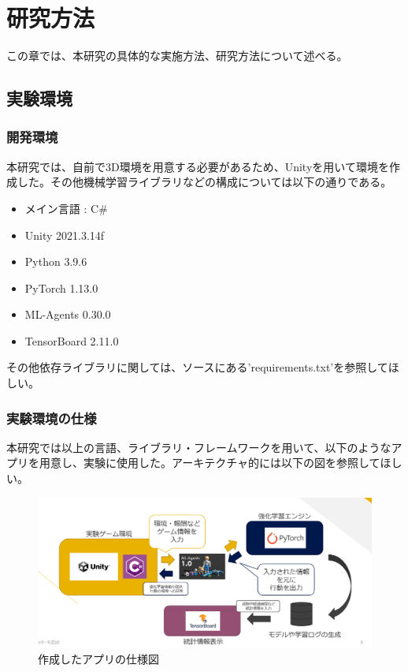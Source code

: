 \documentclass[dvipdfmx]{jsarticle}
\begin{document}
\section{研究方法}
    この章では、本研究の具体的な実施方法、研究方法について述べる。
    \subsection{実験環境}
        \subsubsection{開発環境}
        本研究では、自前で3D環境を用意する必要があるため、Unityを用いて環境を作成した。その他機械学習ライブラリなどの構成については以下の通りである。
        \begin{itemize}
            \item メイン言語 : C\#
            \item Unity 2021.3.14f
            \item Python 3.9.6
            \item PyTorch 1.13.0
            \item ML-Agents 0.30.0
            \item TensorBoard 2.11.0
        \end{itemize}
        その他依存ライブラリに関しては、ソースにある'requirements.txt'を参照してほしい。
        \subsubsection{実験環境の仕様}
        本研究では以上の言語、ライブラリ・フレームワークを用いて、以下のようなアプリを用意し、実験に使用した。アーキテクチャ的には以下の図を参照してほしい。
        \begin{figure}[H]
            \centering
            \includegraphics[scale=0.6]{images/system.PNG}
            \caption{作成したアプリの仕様図}
        \end{figure}
\end{document}

